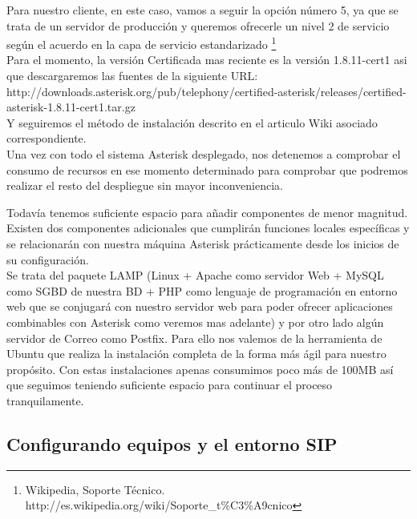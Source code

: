 Para nuestro cliente, en este caso, vamos a seguir la opción número 5, ya que se trata de un servidor de producción y queremos ofrecerle un nivel 2 de servicio según el acuerdo en la capa de servicio estandarizado \footnote{Wikipedia, Soporte Técnico. http://es.wikipedia.org/wiki/Soporte\_t\%C3\%A9cnico}\\

Para el momento, la versión Certificada mas reciente es la versión 1.8.11-cert1 asi que descargaremos las fuentes de la siguiente URL:\\

http://downloads.asterisk.org/pub/telephony/certified-asterisk/releases/certified-asterisk-1.8.11-cert1.tar.gz\\

Y seguiremos el método de instalación descrito en el articulo Wiki asociado correspondiente.\\

Una vez con todo el sistema Asterisk desplegado, nos detenemos a comprobar el consumo de recursos en ese momento determinado para comprobar que podremos realizar el resto del despliegue sin mayor inconveniencia.\\


Todavía tenemos suficiente espacio para añadir componentes de menor magnitud. Existen dos componentes adicionales que cumplirán funciones locales específicas y se relacionarán con nuestra máquina Asterisk prácticamente desde los inicios de su configuración. \\

Se trata del paquete LAMP (Linux + Apache como servidor Web + MySQL como SGBD de nuestra BD + PHP como lenguaje de programación en entorno web que se conjugará con nuestro servidor web para poder ofrecer aplicaciones combinables con Asterisk como veremos mas adelante) y por otro lado algún servidor de Correo como Postfix. Para ello nos valemos de la herramienta  de Ubuntu que realiza la instalación completa de la forma más ágil para nuestro propósito. Con estas instalaciones apenas consumimos poco más de 100MB así que seguimos teniendo suficiente espacio para continuar el proceso tranquilamente.\\

\subsection{Configurando equipos y el entorno SIP}

